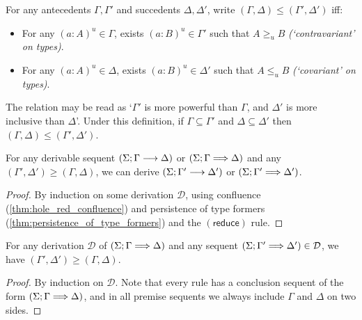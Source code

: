 \documentclass[twoside]{report}
\begin{document}

\begin{definition}
\label{def:sequent_calculi_ordering}
For any antecedents $\Gamma, \Gamma'$ and succedents $\Delta, \Delta'$, write $(\Gamma, \Delta) \leq (\Gamma', \Delta')$ iff:
\begin{itemize}[noitemsep]
    \item For any $(a : A)^u \in \Gamma$, exists $(a : B)^u \in \Gamma'$ such that $A \geq_u B$ \emph{(`contravariant' on types)}.
    \item For any $(a : A)^u \in \Delta$, exists $(a : B)^u \in \Delta'$ such that $A \leq_u B$ \emph{(`covariant' on types)}.
\end{itemize}
\end{definition}

The relation may be read as `$\Gamma'$ is more powerful than $\Gamma$, and $\Delta'$ is more inclusive than $\Delta$'. Under this definition, if $\Gamma \subseteq \Gamma'$ and $\Delta \subseteq \Delta'$ then $(\Gamma, \Delta) \leq (\Gamma', \Delta')$.

\begin{proposition}[Weakening]
\label{thm:sequent_calculi_weakening}
For any derivable sequent $(\Sigma; \Gamma \longrightarrow \Delta)$ or $(\Sigma; \Gamma \Longrightarrow \Delta)$ and any $(\Gamma', \Delta') \geq (\Gamma, \Delta)$, we can derive $(\Sigma; \Gamma' \longrightarrow \Delta')$ or $(\Sigma; \Gamma' \Longrightarrow \Delta')$.
\end{proposition}

\begin{proof}
By induction on some derivation $\mathcal D$, using confluence (\cref{thm:hole_red_confluence}) and persistence of type formers (\cref{thm:persistence_of_type_formers}) and the $(\mathsf{reduce})$ rule.
\end{proof}

\begin{proposition}[Monotonicity]
\label{thm:defocused_calculus_monotonicity}
For any derivation $\mathcal D$ of $(\Sigma; \Gamma \Longrightarrow \Delta)$ and any sequent $(\Sigma; \Gamma' \Longrightarrow \Delta') \in \mathcal D$, we have $(\Gamma', \Delta') \geq (\Gamma, \Delta)$.
\end{proposition}

\begin{proof}
By induction on $\mathcal D$. Note that every rule has a conclusion sequent of the form $(\Sigma; \Gamma \Longrightarrow \Delta)$, and in all premise sequents we always include $\Gamma$ and $\Delta$ on two sides.
\end{proof}
\end{document}
